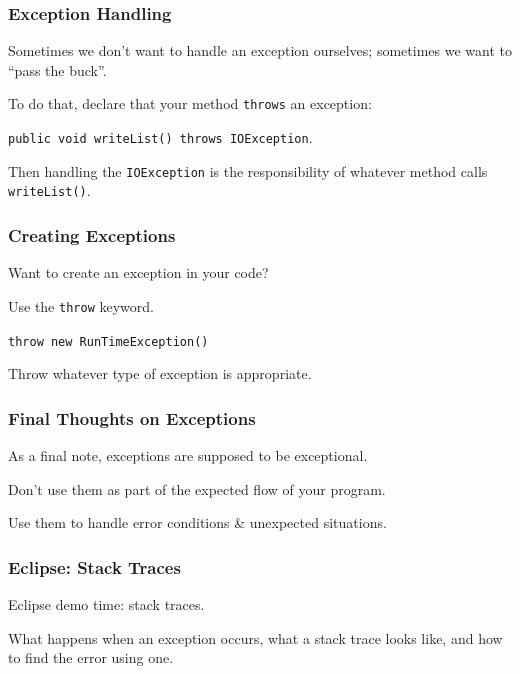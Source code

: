 \begin{frame}
\frametitle{Exception Handling}
\begin{changemargin}{1cm}


Sometimes we don't want to handle an exception ourselves; sometimes we want to ``pass the buck''. 

To do that, declare that your method \texttt{throws} an exception:

\texttt{public void writeList() throws IOException}.


Then handling the \texttt{IOException} is the responsibility of whatever method calls \texttt{writeList()}.

\end{changemargin}
\end{frame}

\begin{frame}
\frametitle{Creating Exceptions}
\begin{changemargin}{1cm}

Want to create an exception in your code? 

Use the \texttt{throw} keyword. 

\texttt{throw new RunTimeException()}

Throw whatever type of exception is appropriate.

\end{changemargin}
\end{frame}

\begin{frame}
\frametitle{Final Thoughts on Exceptions}
\begin{changemargin}{1cm}

As a final note, exceptions are supposed to be exceptional.

Don't use them as part of the expected flow of your program. 

Use them to handle error conditions \& unexpected situations.

\end{changemargin}
\end{frame}

\begin{frame}
\frametitle{Eclipse: Stack Traces}
\begin{changemargin}{1cm}

Eclipse demo time: stack traces.

What happens when an exception occurs, what a stack trace looks like, and how to find the error using one.

\end{changemargin}
\end{frame}



